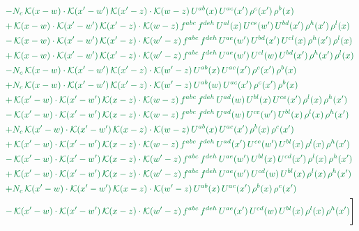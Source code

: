 \documentclass[10pt]{article}
\numberwithin{equation}{section}
\begin{document}
\begin{align}
&{\color{JIM} -N_{c}\,\mathcal{K}(x-w)\cdot\mathcal{K}(x'-w')\,\mathcal{K}(x'-z)\cdot\mathcal{K}(w-z)\,U^{ab}(x)\,U^{ac}(x')\,\rho^{c}(x')\,\rho^{b}(x)} \notag\\
&{\color{JIM} +\,\mathcal{K}(x-w)\cdot\mathcal{K}(x'-w')\,\mathcal{K}(x'-z)\cdot\mathcal{K}(w-z)\,f^{abc}\,f^{deh}\,U^{al}(x)\,U^{ce}(w')\,U^{bd}(x')\,\rho^{h}(x')\,\rho^{l}(x)} \notag\\
&{\color{JIM} -\,\mathcal{K}(x-w)\cdot\mathcal{K}(x'-w')\,\mathcal{K}(x'-z)\cdot\mathcal{K}(w'-z)\,f^{abc}\,f^{deh}\,U^{ae}(w')\,U^{bd}(x')\,U^{cl}(x)\,\rho^{h}(x')\,\rho^{l}(x)} \notag\\
&{\color{JIM} +\,\mathcal{K}(x-w)\cdot\mathcal{K}(x'-w')\,\mathcal{K}(x'-z)\cdot\mathcal{K}(w'-z)\,f^{abc}\,f^{deh}\,U^{ae}(w')\,U^{cl}(w)\,U^{bd}(x')\,\rho^{h}(x')\,\rho^{l}(x)} \notag\\
&{\color{JIM} -N_{c}\,\mathcal{K}(x-w)\cdot\mathcal{K}(x'-w')\,\mathcal{K}(x'-z)\cdot\mathcal{K}(w'-z)\,U^{ab}(x)\,U^{ac}(x')\,\rho^{c}(x')\,\rho^{b}(x)} \notag\\
&{\color{JIM} +N_{c}\,\mathcal{K}(x-w)\cdot\mathcal{K}(x'-w')\,\mathcal{K}(x'-z)\cdot\mathcal{K}(w'-z)\,U^{ab}(w)\,U^{ac}(x')\,\rho^{c}(x')\,\rho^{b}(x)} \notag\\
&{\color{JIM} +\,\mathcal{K}(x'-w)\cdot\mathcal{K}(x'-w')\,\mathcal{K}(x-z)\cdot\mathcal{K}(w-z)\,f^{abc}\,f^{deh}\,U^{ad}(w)\,U^{bl}(x)\,U^{ce}(x')\,\rho^{l}(x)\,\rho^{h}(x')} \notag\\
&{\color{JIM} -\,\mathcal{K}(x'-w)\cdot\mathcal{K}(x'-w')\,\mathcal{K}(x-z)\cdot\mathcal{K}(w-z)\,f^{abc}\,f^{deh}\,U^{ad}(w)\,U^{ce}(w')\,U^{bl}(x)\,\rho^{l}(x)\,\rho^{h}(x')} \notag\\
&{\color{JIM} +N_{c}\,\mathcal{K}(x'-w)\cdot\mathcal{K}(x'-w')\,\mathcal{K}(x-z)\cdot\mathcal{K}(w-z)\,U^{ab}(x)\,U^{ac}(x')\,\rho^{b}(x)\,\rho^{c}(x')} \notag\\
&{\color{JIM} +\,\mathcal{K}(x'-w)\cdot\mathcal{K}(x'-w')\,\mathcal{K}(x-z)\cdot\mathcal{K}(w-z)\,f^{abc}\,f^{deh}\,U^{ad}(x')\,U^{ce}(w')\,U^{bl}(x)\,\rho^{l}(x)\,\rho^{h}(x')} \notag\\
&{\color{JIM} -\,\mathcal{K}(x'-w)\cdot\mathcal{K}(x'-w')\,\mathcal{K}(x-z)\cdot\mathcal{K}(w'-z)\,f^{abc}\,f^{deh}\,U^{ae}(w')\,U^{bl}(x)\,U^{cd}(x')\,\rho^{l}(x)\,\rho^{h}(x')} \notag\\
&{\color{JIM} +\,\mathcal{K}(x'-w)\cdot\mathcal{K}(x'-w')\,\mathcal{K}(x-z)\cdot\mathcal{K}(w'-z)\,f^{abc}\,f^{deh}\,U^{ae}(w')\,U^{cd}(w)\,U^{bl}(x)\,\rho^{l}(x)\,\rho^{h}(x')} \notag\\
&{\color{JIM} +N_{c}\,\mathcal{K}(x'-w)\cdot\mathcal{K}(x'-w')\,\mathcal{K}(x-z)\cdot\mathcal{K}(w'-z)\,U^{ab}(x)\,U^{ac}(x')\,\rho^{b}(x)\,\rho^{c}(x')} \notag\\
&{\color{JIM} -\,\mathcal{K}(x'-w)\cdot\mathcal{K}(x'-w')\,\mathcal{K}(x-z)\cdot\mathcal{K}(w'-z)\,f^{abc}\,f^{deh}\,U^{ae}(x')\,U^{cd}(w)\,U^{bl}(x)\,\rho^{l}(x)\,\rho^{h}(x')}\Bigg] \end{align}
\end{document}
